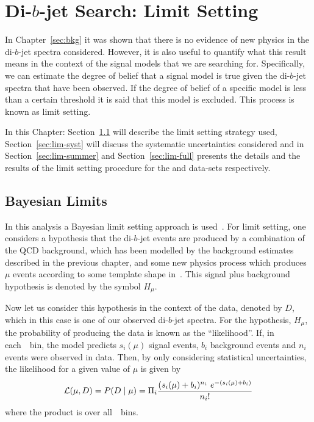 \chapter{Di-$b$-jet Search: Limit Setting}
\label{sec:lim}


In Chapter~\ref{sec:bkg} it was shown that there is no evidence of new physics in the di-$b$-jet spectra considered.
However, it is also useful to quantify what this result means in the context
of the signal models that we are searching for.
Specifically, we can estimate the degree of belief that a signal model is true given the di-$b$-jet spectra that have been observed.
If the degree of belief of a specific model is less than a certain threshold it is said that this model is excluded.
This process is known as limit setting.

In this Chapter:
Section~\ref{sec:lim-strat} will describe the limit setting strategy used,
Section~\ref{sec:lim-syst} will discuss the systematic uncertainties considered
and in Section~\ref{sec:lim-summer} and Section~\ref{sec:lim-full} presents the details and
the results of the limit setting procedure for the \summer{} and \lm{} data-sets respectively.

\section{Bayesian Limits}
\label{sec:lim-strat}

In this analysis a Bayesian limit setting approach is used~\cite{lim-bayes}.
For limit setting, one considers a hypothesis that the di-$b$-jet events are produced by a combination of 
the QCD background, which has been modelled by the background estimates described in the previous chapter,
and some new physics process 
which produces $\mu$ events according to some template shape in~\mjj.
This signal plus background hypothesis is denoted by the symbol $H_\mu$.

Now let us consider this hypothesis in the context of the data, denoted by $D$,
which in this case is one of our observed di-$b$-jet spectra.
For the hypothesis, $H_\mu$, the probability of producing the data is known as the ``likelihood''.
If, in each~\mjj~bin, the model predicts
$s_i(\mu)$ signal events, $b_i$ background events and $n_i$ events were observed in data.
Then, by only considering statistical uncertainties, the likelihood for a given value of $\mu$ is given by
\begin{equation}
  \mathcal{L} (\mu,D) = P(D \mid \mu) =  \Pi_i \frac{(s_i(\mu)+b_i)^{n_i}~e^{-(s_i(\mu)+b_i)}}{n_i!}
  \label{eqn:lim-like}
\end{equation}
where the product is over all~\mjj~bins.

